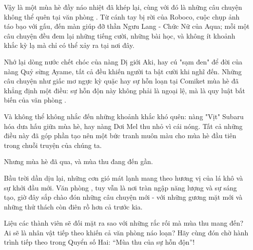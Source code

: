\documentclass[main.tex]{subfiles}
\begin{document}
\color{black}

Vậy là một mùa hè đầy náo nhiệt đã khép lại, cùng với đó là những câu chuyện không thể quên tại văn phòng \hll. Từ cánh tay bị rời của Roboco, cuộc chụp ảnh táo bạo với gấu, đến màn giúp đỡ thần Ngưu Lang - Chức Nữ của Aqua; mỗi một câu chuyện đều đem lại những tiếng cười, những bài học, và không ít khoảnh khắc kỳ lạ mà chỉ có thể xảy ra tại nơi đây.

Nhớ lại dòng nước chết chóc của nàng Dị giới Aki, hay cú "sạm đen" để đời của nàng Quỷ sừng Ayame, tất cả đều khiến người ta bật cười khi nghĩ đến. Những câu chuyện như giấc mơ ngực kỳ quặc hay sự hỗn loạn tại Comiket mùa hè đã khẳng định một điều: sự hỗn độn này không phải là ngoại lệ, mà là quy luật bất biến của văn phòng \hll.

Và không thể không nhắc đến những khoảnh khắc khó quên: nàng "Vịt" Subaru hóa dưa hấu giữa mùa hè, hay nàng Dơi Mel thu nhỏ vì cái nóng. Tất cả những điều này đã góp phần tạo nên một bức tranh muôn màu cho mùa hè đầu tiên trong chuỗi truyện của chúng ta.

Nhưng mùa hè đã qua, và mùa thu đang đến gần.

Bầu trời dần dịu lại, những cơn gió mát lạnh mang theo hương vị của lá khô và sự khởi đầu mới. Văn phòng \hll, tuy vẫn là nơi tràn ngập năng lượng và sự sáng tạo, giờ đây sắp chào đón những câu chuyện mới - với những gương mặt mới và những thử thách còn điên rồ hơn cả trước kia.

Liệu các thành viên sẽ đối mặt ra sao với những rắc rối mà mùa thu mang đến? Ai sẽ là nhân vật tiếp theo khiến cả văn phòng náo loạn? Hãy cùng đón chờ hành trình tiếp theo trong Quyển số Hai: ``Mùa thu của sự hỗn độn''!
\end{document}
